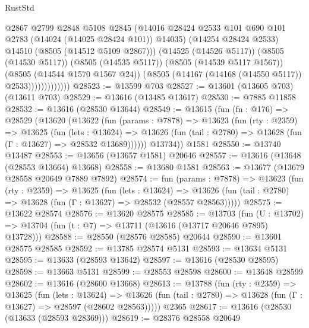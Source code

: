 \begin{lexlean}{RustStd}
\begin{coremodule}
                            @2867
                            @2799
                            @2848
                            @5108
                            @2845
                            (@14016
                              @28424
                              @2533
                              @101
                              @690
                              @101
                              @2783
                              (@14024 (@14025 @28424 @101))
                              @14035)
                            (@14254 @28424 @2533)
                            @14510
                            (@8505 (@14512 @5109 @2867)))
                          (@14525 (@14526 @5117))
                          (@8505 (@14530 @5117))
                          (@8505 (@14535 @5117))
                          (@8505 (@14539 @5117 @1567))
                          (@8505 (@14544 @1570 @1567 @24))
                          (@8505 (@14167 (@14168 (@14550 @5117)) @2533)))))))))))))
@28523 := @13599 @703
@28527 := @13601 (@13605 @703) (@13611 @703)
@28529 := @13616 (@13485 @13617)
@28530 := @7885 @11858
@28532 := @13616 (@28530 @13644)
@28549 := @13615
    (fun (fn : @176) =>
    @28529
      (@13620
        (@13622
          (fun (params : @7878) =>
          @13623
            (fun (rty : @2359) =>
            @13625
              (fun (lets : @13624) =>
              @13626 (fun (tail : @2780) => @13628 (fun (Γ : @13627) => @28532 @13689))))))
        @13734))
    @1581
@28550 := @13740 @13487
@28553 := @13656 (@13657 @1581) @20646
@28557 := @13616 (@13648 (@28553 @13664) @13668)
@28558 := @13680 @1581
@28563 := @13677 (@13679 @28558 @20649 @7889 @7892)
@28574 := fun (params : @7878) =>
  @13623
    (fun (rty : @2359) =>
    @13625
      (fun (lets : @13624) =>
      @13626 (fun (tail : @2780) => @13628 (fun (Γ : @13627) => @28532 (@28557 @28563)))))
@28575 := @13622 @28574
@28576 := @13620 @28575
@28585 := @13703
    (fun (U : @13702) => @13704 (fun (t : @7) => @13711 (@13616 (@13717 @20646 @7895) @13728)))
@28588 := @28550 (@28576 @28585) @20644
@28590 := @13601 @28575 @28585
@28592 := @13785 @28574 @5131
@28593 := @13634 @5131
@28595 := @13633 (@28593 @13642)
@28597 := @13616 (@28530 @28595)
@28598 := @13663 @5131
@28599 := @28553 @28598
@28600 := @13648 @28599
@28602 := @13616 (@28600 @13668)
@28613 := @13788
    (fun (rty : @2359) =>
    @13625
      (fun (lets : @13624) =>
      @13626 (fun (tail : @2780) => @13628 (fun (Γ : @13627) => @28597 (@28602 @28563)))))
    @2365
@28617 := @13616 (@28530 (@13633 (@28593 @28369)))
@28619 := @28376 @28558 @20649

\end{coremodule}
\end{lexlean}
